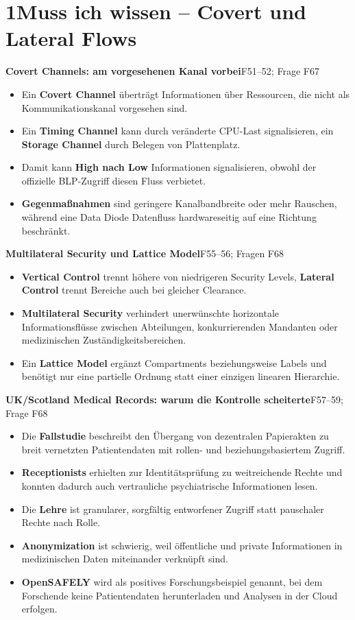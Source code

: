 \documentclass[11pt,a4paper]{article}
\newcommand{\block}[2]{\par\vspace{5pt}\textbf{#1}\hfill{\scriptsize #2}\par\nopagebreak}
\begin{document}
\section*{1\quad Muss ich wissen -- Covert und Lateral Flows}
\block{Covert Channels: am vorgesehenen Kanal vorbei}{F51--52; Frage F67}
\begin{itemize}
\item Ein \textbf{Covert Channel} überträgt Informationen über Ressourcen, die nicht als Kommunikationskanal vorgesehen sind.
\item Ein \textbf{Timing Channel} kann durch veränderte CPU-Last signalisieren, ein \textbf{Storage Channel} durch Belegen von Plattenplatz.
\item Damit kann \textbf{High nach Low} Informationen signalisieren, obwohl der offizielle BLP-Zugriff diesen Fluss verbietet.
\item \textbf{Gegenmaßnahmen} sind geringere Kanalbandbreite oder mehr Rauschen, während eine Data Diode Datenfluss hardwareseitig auf eine Richtung beschränkt.
\end{itemize}
\block{Multilateral Security und Lattice Model}{F55--56; Fragen F68}
\begin{itemize}
\item \textbf{Vertical Control} trennt höhere von niedrigeren Security Levels, \textbf{Lateral Control} trennt Bereiche auch bei gleicher Clearance.
\item \textbf{Multilateral Security} verhindert unerwünschte horizontale Informationsflüsse zwischen Abteilungen, konkurrierenden Mandanten oder medizinischen Zuständigkeitsbereichen.
\item Ein \textbf{Lattice Model} ergänzt Compartments beziehungsweise Labels und benötigt nur eine partielle Ordnung statt einer einzigen linearen Hierarchie.
\end{itemize}
\block{UK/Scotland Medical Records: warum die Kontrolle scheiterte}{F57--59; Frage F68}
\begin{itemize}
\item Die \textbf{Fallstudie} beschreibt den Übergang von dezentralen Papierakten zu breit vernetzten Patientendaten mit rollen- und beziehungsbasiertem Zugriff.
\item \textbf{Receptionists} erhielten zur Identitätsprüfung zu weitreichende Rechte und konnten dadurch auch vertrauliche psychiatrische Informationen lesen.
\item Die \textbf{Lehre} ist granularer, sorgfältig entworfener Zugriff statt pauschaler Rechte nach Rolle.
\item \textbf{Anonymization} ist schwierig, weil öffentliche und private Informationen in medizinischen Daten miteinander verknüpft sind.
\item \textbf{OpenSAFELY} wird als positives Forschungsbeispiel genannt, bei dem Forschende keine Patientendaten herunterladen und Analysen in der Cloud erfolgen.
\end{itemize}
\end{document}
